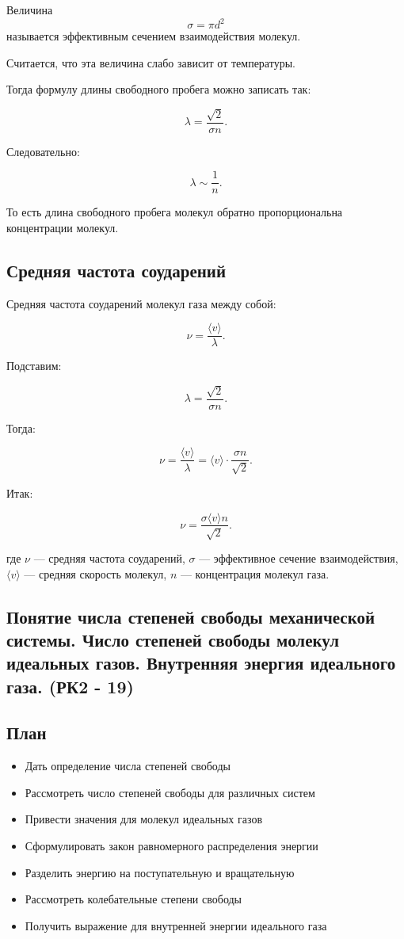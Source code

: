 \documentclass[a4paper,12pt]{article}
\begin{document}
\begin{definitionbox}
Величина
\[
\sigma=\pi d^2
\]
называется эффективным сечением взаимодействия молекул.
\end{definitionbox}

Считается, что эта величина слабо зависит от температуры.

Тогда формулу длины свободного пробега можно записать так:

\[
\lambda=\frac{\sqrt{2}}{\sigma n}.
\]

Следовательно:

\[
\lambda \sim \frac{1}{n}.
\]

То есть длина свободного пробега молекул обратно пропорциональна концентрации молекул.

\subsection*{Средняя частота соударений}

Средняя частота соударений молекул газа между собой:

\[
\nu=\frac{\langle v \rangle}{\lambda}.
\]

Подставим:

\[
\lambda=\frac{\sqrt{2}}{\sigma n}.
\]

Тогда:

\[
\nu=\frac{\langle v \rangle}{\lambda}=\langle v \rangle \cdot \frac{\sigma n}{\sqrt{2}}.
\]

Итак:

\[
\nu=\frac{\sigma \langle v \rangle n}{\sqrt{2}}.
\]

где $\nu$ — средняя частота соударений, $\sigma$ — эффективное сечение взаимодействия, $\langle v \rangle$ — средняя скорость молекул, $n$ — концентрация молекул газа.

\subsection{Понятие числа степеней свободы механической системы. Число степеней свободы молекул идеальных газов. Внутренняя энергия идеального газа. (РК2 - 19)}

\subsection*{План}
\begin{itemize}
\item Дать определение числа степеней свободы
\item Рассмотреть число степеней свободы для различных систем
\item Привести значения для молекул идеальных газов
\item Сформулировать закон равномерного распределения энергии
\item Разделить энергию на поступательную и вращательную
\item Рассмотреть колебательные степени свободы
\item Получить выражение для внутренней энергии идеального газа
\end{itemize}
\end{document}
